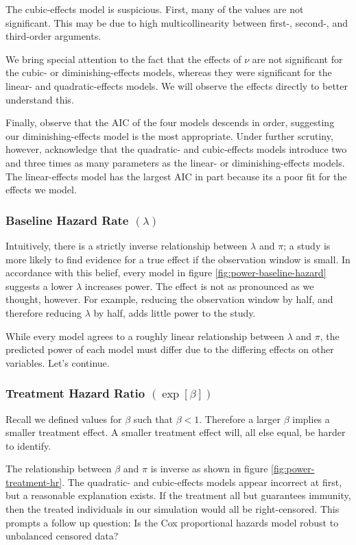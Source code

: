 The cubic-effects model is suspicious. First, many of the values are not significant. This may be due to high multicollinearity between first-, second-, and third-order arguments. 

We bring special attention to the fact that the effects of $\nu$ are not significant for the cubic- or diminishing-effects models, whereas they were significant for the linear- and quadratic-effects models. We will observe the effects directly to better understand this.

Finally, observe that the AIC of the four models descends in order, suggesting our diminishing-effects model is the most appropriate. Under further scrutiny, however, acknowledge that the quadratic- and cubic-effects models introduce two and three times as many parameters as the linear- or diminishing-effects models. The linear-effects model has the largest AIC in part because its a poor fit for the effects we model. 

\subsubsection{Baseline Hazard Rate $(\lambda)$}

Intuitively, there is a strictly inverse relationship between $\lambda$ and $\pi$; a study is more likely to find evidence for a true effect if the observation window is small. In accordance with this belief, every model in figure \ref{fig:power-baseline-hazard} suggests a lower $\lambda$ increases power. The effect is not as pronounced as we thought, however. For example, reducing the observation window by half, and therefore reducing $\lambda$ by half, adds little power to the study.

While every model agrees to a roughly linear relationship between $\lambda$ and $\pi$, the predicted power of each model must differ due to the differing effects on other variables. Let's continue.

\subsubsection{Treatment Hazard Ratio $(\exp[\beta])$}

Recall we defined values for $\beta$ such that $\beta < 1$. Therefore a larger $\beta$ implies a smaller treatment effect. A smaller treatment effect will, all else equal, be harder to identify. 

The relationship between $\beta$ and $\pi$ is inverse as shown in figure \ref{fig:power-treatment-hr}. The quadratic- and cubic-effects models appear incorrect at first, but a reasonable explanation exists. If the treatment all but guarantees immunity, then the treated individuals in our simulation would all be right-censored. This prompts a follow up question: Is the Cox proportional hazards model robust to unbalanced censored data? 

